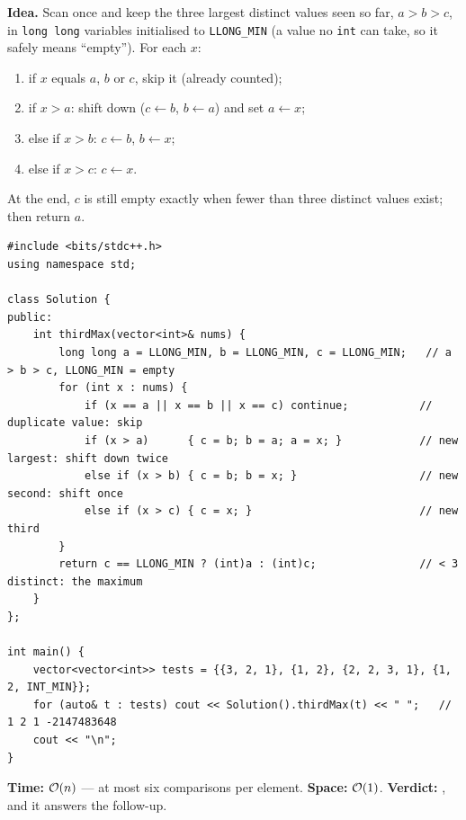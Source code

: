 \begin{algorithmbox}
\textbf{Idea.} Scan once and keep the three largest distinct values seen so far, $a > b > c$, in \texttt{long long} variables initialised to \texttt{LLONG\_MIN} (a value no \texttt{int} can take, so it safely means ``empty''). For each $x$:
\begin{enumerate}[leftmargin=*]
    \item if $x$ equals $a$, $b$ or $c$, skip it (already counted);
    \item if $x > a$: shift down ($c \gets b$, $b \gets a$) and set $a \gets x$;
    \item else if $x > b$: $c \gets b$, $b \gets x$;
    \item else if $x > c$: $c \gets x$.
\end{enumerate}
At the end, $c$ is still empty exactly when fewer than three distinct values exist; then return $a$.
\begin{lstlisting}[style=cpp]
#include <bits/stdc++.h>
using namespace std;

class Solution {
public:
    int thirdMax(vector<int>& nums) {
        long long a = LLONG_MIN, b = LLONG_MIN, c = LLONG_MIN;   // a > b > c, LLONG_MIN = empty
        for (int x : nums) {
            if (x == a || x == b || x == c) continue;           // duplicate value: skip
            if (x > a)      { c = b; b = a; a = x; }            // new largest: shift down twice
            else if (x > b) { c = b; b = x; }                   // new second: shift once
            else if (x > c) { c = x; }                          // new third
        }
        return c == LLONG_MIN ? (int)a : (int)c;                // < 3 distinct: the maximum
    }
};

int main() {
    vector<vector<int>> tests = {{3, 2, 1}, {1, 2}, {2, 2, 3, 1}, {1, 2, INT_MIN}};
    for (auto& t : tests) cout << Solution().thirdMax(t) << " ";   // 1 2 1 -2147483648
    cout << "\n";
}
\end{lstlisting}
\begin{complexitybox}
\textbf{Time:} $\mathcal{O}(n)$ --- at most six comparisons per element. \textbf{Space:} $\mathcal{O}(1)$. \textbf{Verdict:} \ac{}, and it answers the follow-up.
\end{complexitybox}
\end{algorithmbox}

